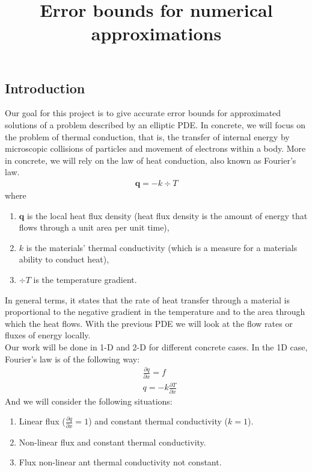 \documentclass{article}
\title{Error bounds for numerical approximations}
\date{}
\begin{document}
	\maketitle
	\subsection*{Introduction}
	Our goal for this project is to give accurate error bounds for approximated solutions of a problem described by an elliptic PDE. In concrete, we will focus on the problem of thermal conduction, that is, the transfer of internal energy by microscopic collisions of particles and movement of electrons within a body. More in concrete, we will rely on the law of heat conduction, also known as Fourier's law.
	\begin{align*}
	\bm{q} = -k \div T
	\end{align*}
	where 
	\begin{enumerate}
		\item[] $\bm{q}$ is the local heat flux density (heat flux density is the amount of energy that flows through a unit area per unit time),
		\item[] $k$ is the materials' thermal conductivity (which is a measure for a materials ability to conduct heat),
		\item[] $\div{T}$ is the temperature gradient.
	\end{enumerate}
	In general terms, it states that the rate of heat transfer through a material is proportional to the negative gradient in the temperature and to the area through which the heat flows. With the previous PDE we will look at the flow rates or fluxes of energy locally. \\
	Our work will be done in 1-D and 2-D for different concrete cases. In the 1D case, Fourier's law is of the following way:
	\begin{align*}
	&\frac{\partial q}{\partial x} = f \\
	&q = -k \frac{\partial T}{\partial x} 
	\end{align*}
	And we will consider the following situations:
	\begin{enumerate}
		\item Linear flux ($\frac{\partial q}{\partial x} = 1$) and constant thermal conductivity ($k=1$).
		\item Non-linear flux and constant thermal conductivity.
		\item Flux non-linear ant thermal conductivity not constant.
	\end{enumerate}
	
\end{document}
